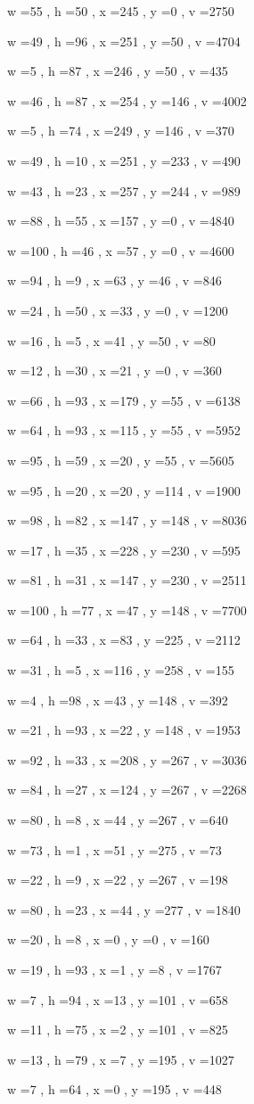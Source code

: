 \documentclass[11pt]{article}
\begin{document}
w =55 , h =50 , x =245 , y =0 , v =2750
\par
w =49 , h =96 , x =251 , y =50 , v =4704
\par
w =5 , h =87 , x =246 , y =50 , v =435
\par
w =46 , h =87 , x =254 , y =146 , v =4002
\par
w =5 , h =74 , x =249 , y =146 , v =370
\par
w =49 , h =10 , x =251 , y =233 , v =490
\par
w =43 , h =23 , x =257 , y =244 , v =989
\par
w =88 , h =55 , x =157 , y =0 , v =4840
\par
w =100 , h =46 , x =57 , y =0 , v =4600
\par
w =94 , h =9 , x =63 , y =46 , v =846
\par
w =24 , h =50 , x =33 , y =0 , v =1200
\par
w =16 , h =5 , x =41 , y =50 , v =80
\par
w =12 , h =30 , x =21 , y =0 , v =360
\par
w =66 , h =93 , x =179 , y =55 , v =6138
\par
w =64 , h =93 , x =115 , y =55 , v =5952
\par
w =95 , h =59 , x =20 , y =55 , v =5605
\par
w =95 , h =20 , x =20 , y =114 , v =1900
\par
w =98 , h =82 , x =147 , y =148 , v =8036
\par
w =17 , h =35 , x =228 , y =230 , v =595
\par
w =81 , h =31 , x =147 , y =230 , v =2511
\par
w =100 , h =77 , x =47 , y =148 , v =7700
\par
w =64 , h =33 , x =83 , y =225 , v =2112
\par
w =31 , h =5 , x =116 , y =258 , v =155
\par
w =4 , h =98 , x =43 , y =148 , v =392
\par
w =21 , h =93 , x =22 , y =148 , v =1953
\par
w =92 , h =33 , x =208 , y =267 , v =3036
\par
w =84 , h =27 , x =124 , y =267 , v =2268
\par
w =80 , h =8 , x =44 , y =267 , v =640
\par
w =73 , h =1 , x =51 , y =275 , v =73
\par
w =22 , h =9 , x =22 , y =267 , v =198
\par
w =80 , h =23 , x =44 , y =277 , v =1840
\par
w =20 , h =8 , x =0 , y =0 , v =160
\par
w =19 , h =93 , x =1 , y =8 , v =1767
\par
w =7 , h =94 , x =13 , y =101 , v =658
\par
w =11 , h =75 , x =2 , y =101 , v =825
\par
w =13 , h =79 , x =7 , y =195 , v =1027
\par
w =7 , h =64 , x =0 , y =195 , v =448
\par
\newpage
\end{document}
